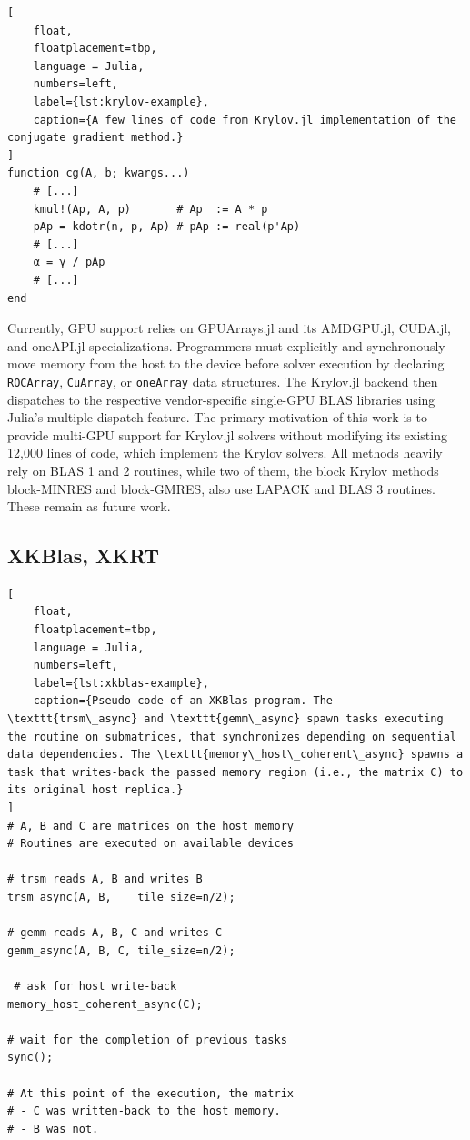 \documentclass{juliacon}
\begin{document}
\lstset{xleftmargin=2em}
\begin{lstlisting}[
    float,
    floatplacement=tbp,
    language = Julia,
    numbers=left, 
    label={lst:krylov-example},
    caption={A few lines of code from Krylov.jl implementation of the conjugate gradient method.}
]
function cg(A, b; kwargs...)
    # [...]
    kmul!(Ap, A, p)       # Ap  := A * p
    pAp = kdotr(n, p, Ap) # pAp := real(p'Ap)
    # [...]
    α = γ / pAp
    # [...]
end
\end{lstlisting}

Currently, GPU support relies on GPUArrays.jl and its AMDGPU.jl, CUDA.jl, and oneAPI.jl specializations.  
Programmers must explicitly and synchronously move memory from the host to the device before solver execution by declaring \texttt{ROCArray}, \texttt{CuArray}, or \texttt{oneArray} data structures.
The Krylov.jl backend then dispatches to the respective vendor-specific single-GPU BLAS libraries using Julia's multiple dispatch feature.  
The primary motivation of this work is to provide multi-GPU support for Krylov.jl solvers without modifying its existing 12,000 lines of code, which implement the Krylov solvers.
All methods heavily rely on BLAS 1 and 2 routines, while two of them, the block Krylov methods block-MINRES and block-GMRES, also use LAPACK and BLAS 3 routines.
These remain as future work.


\subsection{XKBlas, XKRT}

\lstset{xleftmargin=2em}
\begin{lstlisting}[
    float,
    floatplacement=tbp,
    language = Julia,
    numbers=left, 
    label={lst:xkblas-example},
    caption={Pseudo-code of an XKBlas program. The \texttt{trsm\_async} and \texttt{gemm\_async} spawn tasks executing the routine on submatrices, that synchronizes depending on sequential data dependencies. The \texttt{memory\_host\_coherent\_async} spawns a task that writes-back the passed memory region (i.e., the matrix C) to its original host replica.}
]
# A, B and C are matrices on the host memory
# Routines are executed on available devices

# trsm reads A, B and writes B
trsm_async(A, B,    tile_size=n/2);

# gemm reads A, B, C and writes C
gemm_async(A, B, C, tile_size=n/2);

 # ask for host write-back
memory_host_coherent_async(C);

# wait for the completion of previous tasks
sync();

# At this point of the execution, the matrix
# - C was written-back to the host memory.
# - B was not.
\end{lstlisting}
\end{document}
